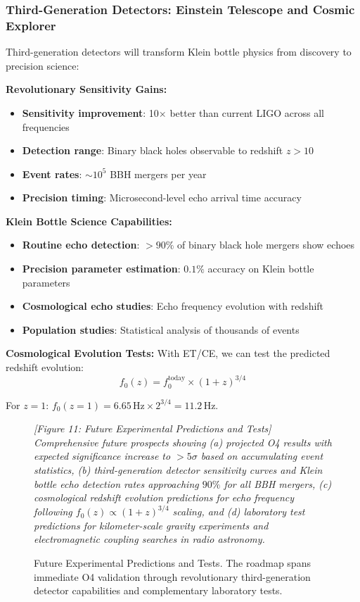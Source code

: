 \documentclass[reprint,amsmath,amssymb,aps,prd]{revtex4-2}
\newcommand{\Hz}{\,\text{Hz}}
\begin{document}
\subsubsection{Third-Generation Detectors: Einstein Telescope and Cosmic Explorer}

Third-generation detectors will transform Klein bottle physics from discovery to precision science:

\textbf{Revolutionary Sensitivity Gains:}
\begin{itemize}
\item \textbf{Sensitivity improvement}: 10$\times$ better than current LIGO across all frequencies
\item \textbf{Detection range}: Binary black holes observable to redshift $z > 10$
\item \textbf{Event rates}: $\sim 10^5$ BBH mergers per year
\item \textbf{Precision timing}: Microsecond-level echo arrival time accuracy
\end{itemize}

\textbf{Klein Bottle Science Capabilities:}
\begin{itemize}
\item \textbf{Routine echo detection}: $> 90\%$ of binary black hole mergers show echoes
\item \textbf{Precision parameter estimation}: $0.1\%$ accuracy on Klein bottle parameters
\item \textbf{Cosmological echo studies}: Echo frequency evolution with redshift
\item \textbf{Population studies}: Statistical analysis of thousands of events
\end{itemize}

\textbf{Cosmological Evolution Tests:}
With ET/CE, we can test the predicted redshift evolution:
\begin{equation}
f_0(z) = f_0^{\text{today}} \times (1+z)^{3/4}
\end{equation}

For $z = 1$: $f_0(z=1) = 6.65\Hz \times 2^{3/4} = 11.2\Hz$.

\begin{figure}[htbp]
\centering
\textit{[Figure 11: Future Experimental Predictions and Tests]}
\textit{Comprehensive future prospects showing (a) projected O4 results with expected significance increase to $>5\sigma$ based on accumulating event statistics, (b) third-generation detector sensitivity curves and Klein bottle echo detection rates approaching $90\%$ for all BBH mergers, (c) cosmological redshift evolution predictions for echo frequency following $f_0(z) \propto (1+z)^{3/4}$ scaling, and (d) laboratory test predictions for kilometer-scale gravity experiments and electromagnetic coupling searches in radio astronomy.}
\caption{Future Experimental Predictions and Tests. The roadmap spans immediate O4 validation through revolutionary third-generation detector capabilities and complementary laboratory tests.}
\label{fig:future_predictions}
\end{figure}
\end{document}
